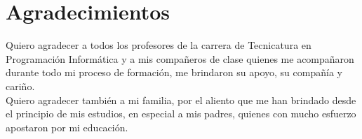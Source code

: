 \section*{Agradecimientos}
\jump[3]
\begin{raggedleft}
	
	Quiero agradecer a todos los profesores de la carrera de Tecnicatura en Programación
	Informática y a mis compañeros de clase quienes me acompañaron durante todo mi proceso
	de formación, me brindaron su apoyo, su compañía y cariño. \\
	\jump
	Quiero agradecer también a mi familia, por el aliento que me han brindado desde el
	principio de mis estudios, en especial a mis padres, quienes con mucho esfuerzo
	apostaron por mi educación.\\
	
\end{raggedleft}